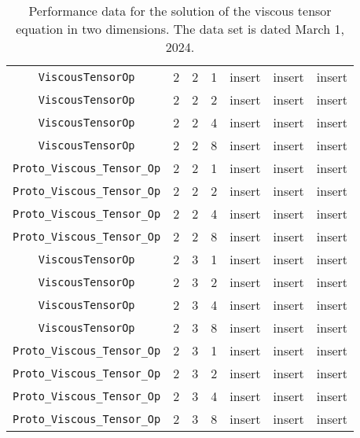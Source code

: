 \documentclass{article}
\begin{document}
\begin{small}
\begin{table}
\begin{center}
\begin{tabular}{|c|c|c|c|c|c||c|}
\hline                                                                                
 {\tt ViscousTensorOp}            & 2 & 2   & 1    &  insert  &  insert    & insert    \\
 {\tt ViscousTensorOp}            & 2 & 2   & 2    &  insert  &  insert    & insert    \\
 {\tt ViscousTensorOp}            & 2 & 2   & 4    &  insert  &  insert    & insert    \\
 {\tt ViscousTensorOp}            & 2 & 2   & 8    &  insert  &  insert    & insert    \\
\hline                                                                                
 {\tt Proto\_Viscous\_Tensor\_Op} & 2 & 2   & 1    &  insert  &  insert    & insert   \\
 {\tt Proto\_Viscous\_Tensor\_Op} & 2 & 2   & 2    &  insert  &  insert    & insert   \\
 {\tt Proto\_Viscous\_Tensor\_Op} & 2 & 2   & 4    &  insert  &  insert    & insert   \\
 {\tt Proto\_Viscous\_Tensor\_Op} & 2 & 2   & 8    &  insert  &  insert    & insert   \\
 \hline                                                                               
 {\tt ViscousTensorOp}            & 2 & 3   & 1    &  insert  &  insert    & insert    \\
 {\tt ViscousTensorOp}            & 2 & 3   & 2    &  insert  &  insert    & insert    \\
 {\tt ViscousTensorOp}            & 2 & 3   & 4    &  insert  &  insert    & insert    \\
 {\tt ViscousTensorOp}            & 2 & 3   & 8    &  insert  &  insert    & insert    \\
\hline                                                                                
 {\tt Proto\_Viscous\_Tensor\_Op} & 2 & 3   & 1    &  insert  &  insert    & insert   \\
 {\tt Proto\_Viscous\_Tensor\_Op} & 2 & 3   & 2    &  insert  &  insert    & insert   \\
 {\tt Proto\_Viscous\_Tensor\_Op} & 2 & 3   & 4    &  insert  &  insert    & insert   \\
 {\tt Proto\_Viscous\_Tensor\_Op} & 2 & 3   & 8    &  insert  &  insert    & insert   \\
 \hline
\end{tabular}
\end{center}
\label{tab::viscous_2d}
\caption
    {
      Performance data for the solution of the viscous tensor
      equation in two dimensions.
      The data set is dated March 1, 2024.
    }
\end{table}
\end{small}
\end{document}
